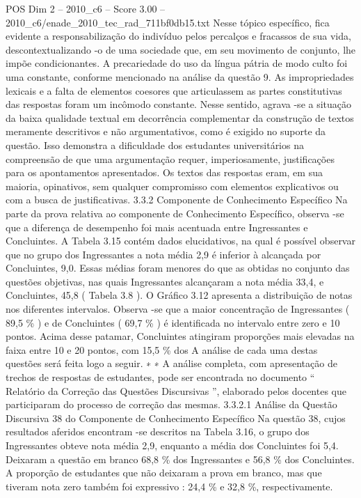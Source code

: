 \begin{textsample}{POS Dim 2 – 2010\_c6 – Score 3.00 – 2010\_c6/enade\_2010\_tec\_rad\_711bf0db15.txt}
Nesse tópico específico, fica evidente a responsabilização do indivíduo pelos percalços e fracassos de sua vida, descontextualizando -o de uma sociedade que, em seu movimento de conjunto, lhe impõe condicionantes.
A precariedade do uso da língua pátria de modo culto foi uma constante, conforme mencionado na análise da questão 9.
As impropriedades lexicais e a falta de elementos coesores que articulassem as partes constitutivas das respostas foram um incômodo constante.
Nesse sentido, agrava -se a situação da baixa qualidade textual em decorrência complementar da construção de textos meramente descritivos e não argumentativos, como é exigido no suporte da questão.
Isso demonstra a dificuldade dos estudantes universitários na compreensão de que uma argumentação requer, imperiosamente, justificações para os apontamentos apresentados.
Os textos das respostas eram, em sua maioria, opinativos, sem qualquer compromisso com elementos explicativos ou com a busca de justificativas. 3.3.2 Componente de Conhecimento Específico Na parte da prova relativa ao componente de Conhecimento Específico, observa -se que a diferença de desempenho foi mais acentuada entre Ingressantes e Concluintes.
A Tabela 3.15 contém dados elucidativos, na qual é possível observar que no grupo dos Ingressantes a nota média 2,9 é inferior à alcançada por Concluintes, 9,0.
Essas médias foram menores do que as obtidas no conjunto das questões objetivas, nas quais Ingressantes alcançaram a nota média 33,4, e Concluintes, 45,8 ( Tabela 3.8 ).
O Gráfico 3.12 apresenta a distribuição de notas nos diferentes intervalos.
Observa -se que a maior concentração de Ingressantes ( 89,5 \% ) e de Concluintes ( 69,7 \% ) é identificada no intervalo entre zero e 10 pontos.
Acima desse patamar, Concluintes atingiram proporções mais elevadas na faixa entre 10 e 20 pontos, com 15,5 \% dos A análise de cada uma destas questões será feita logo a seguir. ∗ ∗ A análise completa, com apresentação de trechos de respostas de estudantes, pode ser encontrada no documento “ Relatório da Correção das Questões Discursivas ”, elaborado pelos docentes que participaram do processo de correção das mesmas. 3.3.2.1 Análise da Questão Discursiva 38 do Componente de Conhecimento Específico Na questão 38, cujos resultados aferidos encontram -se descritos na Tabela 3.16, o grupo dos Ingressantes obteve nota média 2,9, enquanto a média dos Concluintes foi 5,4.
Deixaram a questão em branco 68,8 \% dos Ingressantes e 56,8 \% dos Concluintes.
A proporção de estudantes que não deixaram a prova em branco, mas que tiveram nota zero também foi expressivo : 24,4 \% e 32,8 \%, respectivamente.

\end{textsample}
